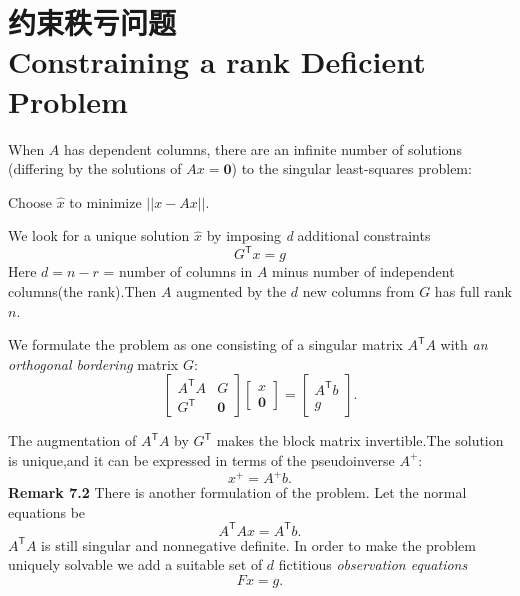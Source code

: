 \section[约束秩亏问题]{约束秩亏问题\\Constraining a rank Deficient Problem}	
When $A$ has dependent columns, there are an infinite number of solutions (differing by the solutions of $Ax= \mathbf{0}$) to the singular least-squares problem:
\begin{center}
	Choose $\hat{x}$ to minimize $||{x - Ax}||$.
\end{center}
We look for a unique solution $\hat{x}$ by imposing \emph{d} additional constraints
\begin{equation}
	G^\mathsf{T}x
	=g
\end{equation}
Here $d = n - r$ = number of columns in $A$ minus number of independent columns(the rank).Then $A$ augmented by the $d$ new columns from  $G$ has full rank $n$.
\par
We formulate the problem as one consisting of a singular matrix $A^\mathsf{T}A$ with \emph{an orthogonal bordering} matrix $G$:
\begin{equation}
	\begin{bmatrix}
		A^\mathsf{T}A & G \\
		G^\mathsf{T} & \mathbf{0}
	\end{bmatrix}
	\begin{bmatrix}
		x\\
		\mathbf{0}
	\end{bmatrix}
	=
	\begin{bmatrix}
		A^\mathsf{T}b \\ g
	\end{bmatrix}.
\end{equation}
\par\noindent
The augmentation of $A^\mathsf{T}A$ by $G^\mathsf{T}$ makes the block matrix invertible.The solution is unique,and it can be expressed in terms of the pseudoinverse  $A^\mathsf{+}$:
\begin{equation}
	x^\mathsf{+}
	=A^\mathsf{+}b.
\end{equation}
\textbf{Remark 7.2} There is another formulation of the problem. Let the normal equations be
\begin{equation}
	A^\mathsf{T}Ax
	=A^\mathsf{T}b.
\end{equation}
$A^\mathsf{T}A$ is still singular and nonnegative definite. In order to make the problem uniquely solvable we add a suitable set of $d$ fictitious \emph{observation equations}
\begin{equation}
	Fx
	=g.
\end{equation}
